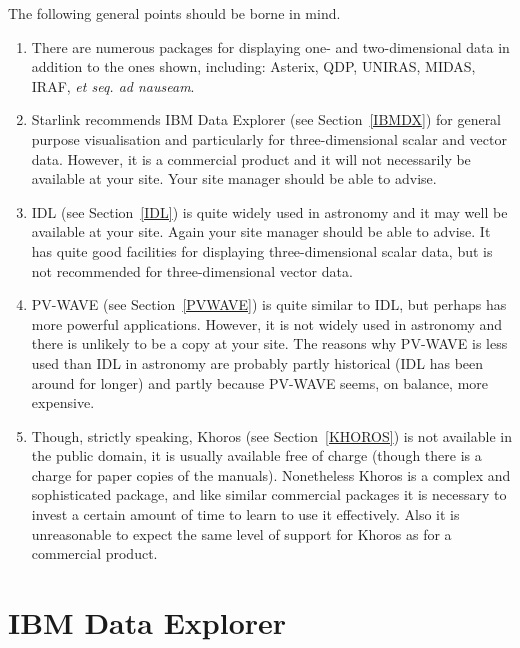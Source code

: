 \documentclass[twoside,11pt]{article}
\newcommand{\xlabel}[1]{}
\begin{document}
The following general points should be borne in mind.

\begin{enumerate}

  \item There are numerous packages for displaying one- and
   two-dimensional data in addition to the ones shown, including:
   Asterix, QDP, UNIRAS, MIDAS, IRAF, {\it et seq. ad nauseam}.

  \item Starlink recommends IBM Data Explorer (see Section~\ref{IBMDX})
   for general purpose visualisation and particularly for
   three-dimensional scalar and vector data. However, it is a
   commercial product and it will not necessarily be available at your
   site. Your site manager should be able to advise.

  \item IDL (see Section~\ref{IDL}) is quite widely used in astronomy
   and it may well be available at your site. Again your site manager
   should be able to advise. It has quite good facilities for displaying
   three-dimensional scalar data, but is not recommended for
   three-dimensional vector data.

  \item PV-WAVE (see Section~\ref{PVWAVE}) is quite similar to IDL, but
   perhaps has more powerful applications. However, it is not widely
   used in astronomy and there is unlikely to be a copy at your site.
   The reasons why PV-WAVE is less used than IDL in astronomy are
   probably partly historical (IDL has been around for longer) and
   partly because PV-WAVE seems, on balance, more expensive.

  \item Though, strictly speaking, Khoros (see Section~\ref{KHOROS}) is
   not available in the public domain, it is usually available free of
   charge (though there is a charge for paper copies of the manuals).
   Nonetheless Khoros is a complex and sophisticated package, and like
   similar commercial packages it is necessary to invest a certain
   amount of time to learn to use it effectively. Also it is
   unreasonable to expect the same level of support for Khoros as for
   a commercial product.

\end{enumerate}


\section{IBM Data Explorer \label{IBMDX} \xlabel{IBMDX} }
\end{document}
